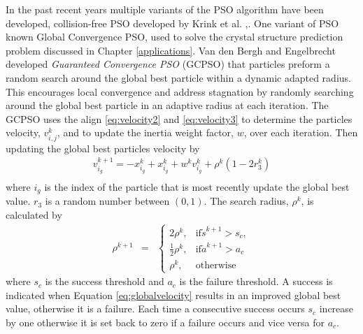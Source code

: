 In the past recent years multiple variants of the PSO algorithm have been developed, collision-free PSO developed by Krink et al. \cite{},. One variant of PSO known Global Convergence PSO, used to solve the crystal structure prediction problem discussed in Chapter \ref{applications}. Van den Bergh and Engelbrecht \cite{} developed \textit{Guaranteed Convergence PSO} (GCPSO) that particles preform a random search around the global best particle within a dynamic adapted radius.
This encourages local convergence and address stagnation by randomly searching around the global best particle in an adaptive radius at each iteration. The GCPSO uses the align \ref{eq:velocity2} and \ref{eq:velocity3} to determine the particles velocity, $v^k_{i,j}$, and to update the inertia weight factor, $w$, over each iteration. Then updating the global best particles velocity by
\begin{align}
    \label{eq:globalvelocity}
    v^{k+1}_{i_g} = -x^k_{i_g} + x^k_{i_g} + w^k v^k_{i_g} + \rho^k(1-2r^k_3) \\
\end{align}
where $i_g$ is the index of the particle that is most recently update the global best value. $r_3$ is a random number between $(0,1)$. The search radius, $\rho^k$, is calculated by
\begin{eqnarray}
    \rho^{k+1} & = &
    \begin{cases}
        2\rho^k, &\text{if} \check{s}^{k+1} > s_c,\\
        \frac{1}{2}\rho^k, &\text{if} \check{a}^{k+1}>a_c\\
        \rho^k, & \mbox{otherwise}
    \end{cases}
    \label{eq:rho}
\end{eqnarray}
where $s_c$ is the success threshold and $a_c$ is the failure threshold. A success is indicated when Equation \ref{eq:globalvelocity} results in an improved global best value, otherwise it is a failure. Each time a consecutive success occurs $s_c$ increase by one otherwise it is set back to zero if a failure occurs and vice versa for $a_c$. 

    

